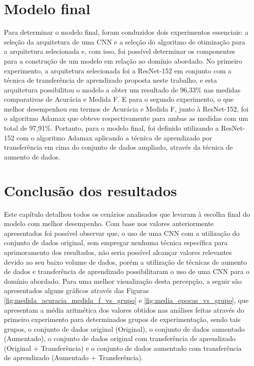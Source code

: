\documentclass[
	12pt,				%
	oneside,			%
	a4paper,			%
	english,			%
	brazil				%
	]{abntex2ppgsi}
\begin{document}
\section{Modelo final}
Para determinar o modelo final, foram conduzidos dois experimentos essenciais: a seleção da arquitetura de uma CNN e a seleção do algoritmo de otimização para a arquitetura selecionada e, com isso, foi possível determinar os componentes para a construção de um modelo em relação ao domínio abordado. No primeiro experimento, a arquitetura selecionada foi a ResNet-152 em conjunto com a técnica de transferência de aprendizado proposta neste trabalho, e esta arquitetura possibilitou o modelo a obter um resultado de 96,33\% nas medidas comparativas de Acurácia e Medida F. E para o segundo experimento, o que melhor desempenhou em termos de Acurácia e Medida F, junto à ResNet-152, foi o algoritmo Adamax que obteve respectivamente para ambas as medidas com um total de 97,91\%. Portanto, para o modelo final, foi definido utilizando a ResNet-152 com o algoritmo Adamax aplicando a técnica de aprendizado por transferência em cima do conjunto de dados ampliado, através da técnica de aumento de dados.

\section{Conclusão dos resultados}
Este capítulo detalhou todos os cenários analisados que levaram à escolha final do modelo com melhor desempenho. Com base nos valores anteriormente apresentados foi possível observar que, o uso de uma CNN com a utilização do conjunto de dados original, sem empregar nenhuma técnica específica para aprimoramento dos resultados, não seria possível alcançar valores relevantes devido ao seu baixo volume de dados, porém a utilização de técnicas de aumento de dados e transferência de aprendizado possibilitaram o uso de uma CNN para o domínio abordado. Para uma melhor visualização desta percepção, a seguir são apresentados alguns gráficos através das Figuras \ref{fig:medida_acuracia_medida_f_vs_grupo} e \ref{fig:media_epocas_vs_grupo}, que apresentam a média aritmética dos valores obtidos nas análises feitas através do primeiro experimento para determinados grupos de experimentação, sendo tais grupos, o conjunto de dados original (Original), o conjunto de dados aumentado (Aumentado), o conjunto de dados original com transferência de aprendizado (Original + Transferência) e o conjunto de dados aumentado com transferência de aprendizado (Aumentado + Transferência).
\end{document}
